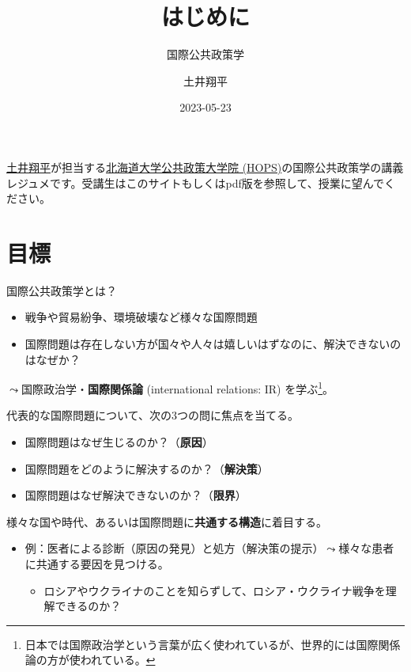 \documentclass[
  xelatex,
  ja=standard]{bxjsarticle}
\title{はじめに}
\subtitle{国際公共政策学}
\author{土井翔平}
\date{2023-05-23}
\providecommand{\tightlist}{%
  \setlength{\itemsep}{0pt}\setlength{\parskip}{0pt}}\usepackage{longtable,booktabs,array}
\begin{document}
\maketitle
\ifdefined\Shaded\renewenvironment{Shaded}{\begin{tcolorbox}[enhanced, borderline west={3pt}{0pt}{shadecolor}, boxrule=0pt, frame hidden, interior hidden, breakable, sharp corners]}{\end{tcolorbox}}\fi

\href{https://shohei-doi.github.io}{土井翔平}が担当する\href{https://www.hops.hokudai.ac.jp/}{北海道大学公共政策大学院
(HOPS)}の国際公共政策学の講義レジュメです。受講生はこのサイトもしくはpdf版を参照して、授業に望んでください。

\hypertarget{ux76eeux6a19}{%
\section{目標}\label{ux76eeux6a19}}

国際公共政策学とは？

\begin{itemize}
\tightlist
\item
  戦争や貿易紛争、環境破壊など様々な国際問題
\item
  国際問題は存在しない方が国々や人々は嬉しいはずなのに、解決できないのはなぜか？
\end{itemize}

\(\leadsto\)国際政治学・\textbf{国際関係論} (international relations:
IR) を学ぶ\footnote{日本では国際政治学という言葉が広く使われているが、世界的には国際関係論の方が使われている。}。

代表的な国際問題について、次の3つの問に焦点を当てる。

\begin{itemize}
\tightlist
\item
  国際問題はなぜ生じるのか？（\textbf{原因}）
\item
  国際問題をどのように解決するのか？（\textbf{解決策}）
\item
  国際問題はなぜ解決できないのか？（\textbf{限界}）
\end{itemize}

様々な国や時代、あるいは国際問題に\textbf{共通する構造}に着目する。

\begin{itemize}
\tightlist
\item
  例：医者による診断（原因の発見）と処方（解決策の提示）\(\leadsto\)様々な患者に共通する要因を見つける。

  \begin{itemize}
  \tightlist
  \item
    ロシアやウクライナのことを知らずして、ロシア・ウクライナ戦争を理解できるのか？
  \end{itemize}
\end{itemize}
\end{document}
